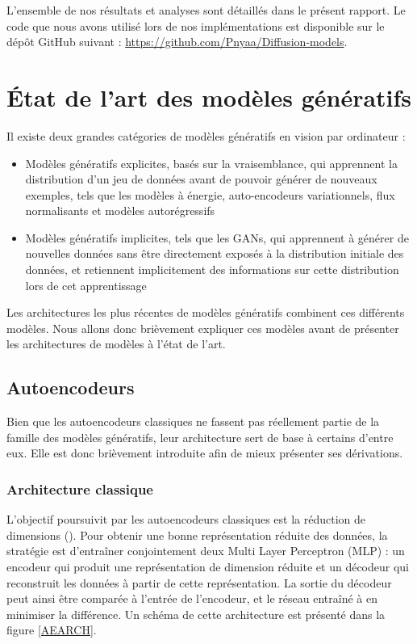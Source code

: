 \documentclass{article}
\begin{document}
\vspace{0.3cm}

L'ensemble de nos résultats et analyses sont détaillés dans le présent rapport. Le code que nous avons utilisé lors de nos implémentations est disponible sur le dépôt GitHub suivant : \url{https://github.com/Pnyaa/Diffusion-models}.


\clearpage
\section{État de l'art des modèles génératifs}

Il existe deux grandes catégories de modèles génératifs en vision par ordinateur :
\begin{itemize}
    \item Modèles génératifs explicites, basés sur la vraisemblance, qui apprennent la distribution d'un jeu de données avant de pouvoir générer de nouveaux exemples, tels que les modèles à énergie, auto-encodeurs variationnels, flux normalisants et modèles autorégressifs
    \item Modèles génératifs implicites, tels que les GANs, qui apprennent à générer de nouvelles données sans être directement exposés à la distribution initiale des données, et retiennent implicitement des informations sur cette distribution lors de cet apprentissage
\end{itemize}
Les architectures les plus récentes de modèles génératifs combinent ces différents modèles. Nous allons donc brièvement expliquer ces modèles avant de présenter les architectures de modèles à l'état de l'art.

\subsection{Autoencodeurs}
Bien que les autoencodeurs classiques ne fassent pas réellement partie de la famille des modèles génératifs, leur architecture sert de base à certains d'entre eux. Elle est donc brièvement introduite afin de mieux présenter ses dérivations. 
\subsubsection{Architecture classique}

L'objectif poursuivit par les autoencodeurs classiques est la réduction de dimensions (\cite{AEORG}). Pour obtenir une bonne représentation réduite des données, la stratégie est d'entraîner conjointement deux Multi Layer Perceptron (MLP) : un encodeur qui produit une représentation de dimension réduite et un décodeur qui reconstruit les données à partir de cette représentation. La sortie du décodeur peut ainsi être comparée à l'entrée de l'encodeur, et le réseau entraîné à en minimiser la différence. Un schéma de cette architecture est présenté dans la figure \ref{AEARCH}.
\end{document}
